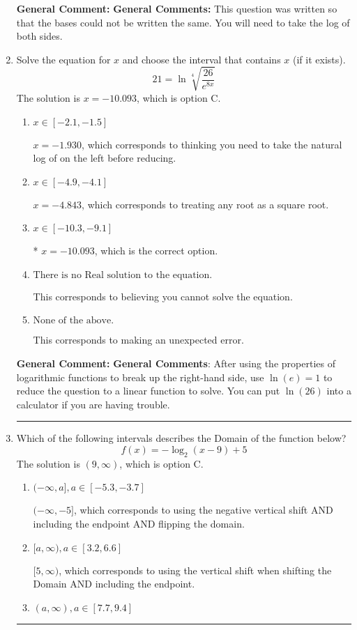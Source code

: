 \documentclass{extbook}[14pt]
\newcommand{\litem}[1]{\item #1

\rule{\textwidth}{0.4pt}}
\begin{document}
\begin{enumerate}
{\textbf{General Comment:} \textbf{General Comments:} This question was written so that the bases could not be written the same. You will need to take the log of both sides.
}
\litem{
 Solve the equation for $x$ and choose the interval that contains $x$ (if it exists).
\[  21 = \ln{\sqrt[4]{\frac{26}{e^{8x}}}} \]
The solution is \( x = -10.093 \), which is option C.\begin{enumerate}[label=\Alph*.]
\item \( x \in [-2.1, -1.5] \)

$x = -1.930$, which corresponds to thinking you need to take the natural log of on the left before reducing.
\item \( x \in [-4.9, -4.1] \)

$x = -4.843$, which corresponds to treating any root as a square root.
\item \( x \in [-10.3, -9.1] \)

* $x = -10.093$, which is the correct option.
\item \( \text{There is no Real solution to the equation.} \)

This corresponds to believing you cannot solve the equation.
\item \( \text{None of the above.} \)

This corresponds to making an unexpected error.
\end{enumerate}

\textbf{General Comment:} \textbf{General Comments}: After using the properties of logarithmic functions to break up the right-hand side, use $\ln(e) = 1$ to reduce the question to a linear function to solve. You can put $\ln(26)$ into a calculator if you are having trouble.
}
\litem{
Which of the following intervals describes the Domain of the function below?
\[ f(x) = -\log_2{(x-9)}+5 \]
The solution is \( (9, \infty) \), which is option C.\begin{enumerate}[label=\Alph*.]
\item \( (-\infty, a], a \in [-5.3, -3.7] \)

$(-\infty, -5]$, which corresponds to using the negative vertical shift AND including the endpoint AND flipping the domain.
\item \( [a, \infty), a \in [3.2, 6.6] \)

$[5, \infty)$, which corresponds to using the vertical shift when shifting the Domain AND including the endpoint.
\item \( (a, \infty), a \in [7.7, 9.4] \)


\end{enumerate}}
\end{enumerate}
\end{document}
